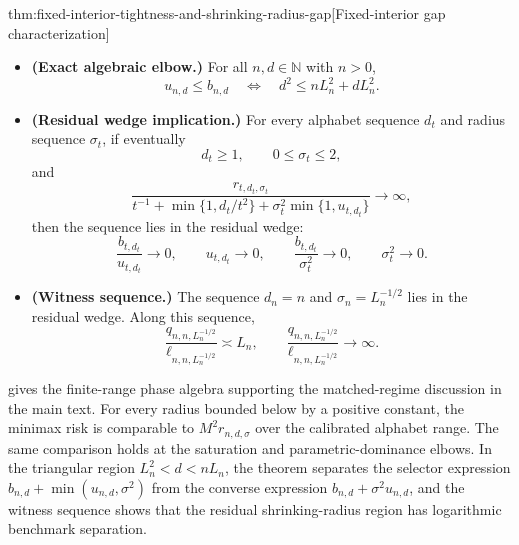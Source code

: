 \begin{theoremv}{thm:fixed-interior-tightness-and-shrinking-radius-gap}[Fixed-interior gap characterization]
\begin{itemize}
\item \textbf{(Exact algebraic elbow.)}  For all \(n,d\in\mathbb N\) with \(n>0\),
\[
u_{n,d}\le b_{n,d}
\quad\Longleftrightarrow\quad
d^2\le nL_n^2+dL_n^2.
\]

\item \textbf{(Residual wedge implication.)}  For every alphabet sequence \(d_t\) and radius sequence \(\sigma_t\), if eventually
\[
d_t\ge1,\qquad 0\le\sigma_t\le2,
\]
and
\[
\frac{r_{t,d_t,\sigma_t}}{t^{-1}+\min\{1,d_t/t^2\}+\sigma_t^2\min\{1,u_{t,d_t}\}}\longrightarrow\infty,
\]
then the sequence lies in the residual wedge:
\[
\frac{b_{t,d_t}}{u_{t,d_t}}\longrightarrow0,\qquad
u_{t,d_t}\longrightarrow0,\qquad
\frac{b_{t,d_t}}{\sigma_t^2}\longrightarrow0,\qquad
\sigma_t^2\longrightarrow0.
\]

\item \textbf{(Witness sequence.)}  The sequence \(d_n=n\) and \(\sigma_n=L_n^{-1/2}\) lies in the residual wedge.  Along this sequence,
\[
\frac{q_{n,n,L_n^{-1/2}}}{\ell_{n,n,L_n^{-1/2}}}
\asymp L_n,
\qquad
\frac{q_{n,n,L_n^{-1/2}}}{\ell_{n,n,L_n^{-1/2}}}\longrightarrow\infty .
\]
\end{itemize}
\end{theoremv}

 gives the finite-range phase algebra supporting the matched-regime discussion in the main text. For every radius bounded below by a positive constant, the minimax risk is comparable to \(M^2r_{n,d,\sigma}\) over the calibrated alphabet range. The same comparison holds at the saturation and parametric-dominance elbows. In the triangular region \(L_n^2<d<nL_n\), the theorem separates the selector expression \(b_{n,d}+\min(u_{n,d},\sigma^2)\) from the converse expression \(b_{n,d}+\sigma^2u_{n,d}\), and the witness sequence shows that the residual shrinking-radius region has logarithmic benchmark separation.
